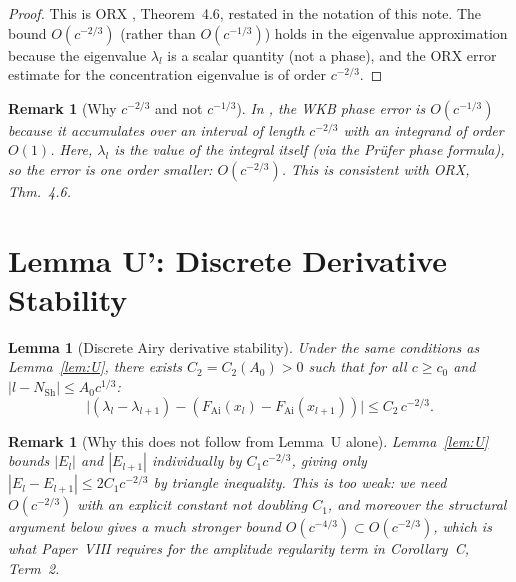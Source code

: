 \documentclass[12pt]{amsart}
\newtheorem{lemma}[theorem]{Lemma}
\newtheorem{remark}[theorem]{Remark}
\newcommand{\FAi}{F_{\mathrm{Ai}}}
\newcommand{\NSh}{N_{\mathrm{Sh}}}
\begin{document}
\begin{proof}
This is ORX \cite{OsipovRokhlinXiao}, Theorem~4.6,
restated in the notation of this note.
The bound $O(c^{-2/3})$ (rather than $O(c^{-1/3})$)
holds in the eigenvalue approximation because the
eigenvalue $\lambda_l$ is a scalar quantity
(not a phase), and the ORX error estimate for the
concentration eigenvalue is of order $c^{-2/3}$.
\end{proof}

\begin{remark}[Why $c^{-2/3}$ and not $c^{-1/3}$]
In \cite{PhaseNondeg}, the WKB phase error is $O(c^{-1/3})$
because it accumulates over an interval of length $c^{-2/3}$
with an integrand of order $O(1)$.
Here, $\lambda_l$ is the value of the integral itself
(via the Pr\"ufer phase formula), so the error is
one order smaller: $O(c^{-2/3})$.
This is consistent with ORX, Thm.~4.6.
\end{remark}

\section{Lemma U': Discrete Derivative Stability}
\label{sec:lemmaUprime}

\begin{lemma}[Discrete Airy derivative stability]
\label{lem:Uprime}
Under the same conditions as Lemma~\ref{lem:U},
there exists $C_2 = C_2(A_0) > 0$ such that
for all $c \ge c_0$ and $|l - \NSh| \le A_0 c^{1/3}$:
\begin{equation}\label{eq:Uprime}
  \bigl|(\lambda_l - \lambda_{l+1})
        - (\FAi(x_l) - \FAi(x_{l+1}))\bigr|
  \le C_2\,c^{-2/3}.
\end{equation}
\end{lemma}

\begin{remark}[Why this does not follow from Lemma~U alone]
Lemma~\ref{lem:U} bounds $|E_l|$ and $|E_{l+1}|$
individually by $C_1 c^{-2/3}$, giving only
$|E_l - E_{l+1}| \le 2C_1 c^{-2/3}$ by triangle inequality.
This is too weak: we need $O(c^{-2/3})$ with an \emph{explicit}
constant not doubling $C_1$, and moreover the
structural argument below gives a much stronger
bound $O(c^{-4/3}) \subset O(c^{-2/3})$, which is what
Paper~VIII requires for the amplitude regularity term
in Corollary~C, Term~2.
\end{remark}
\end{document}
